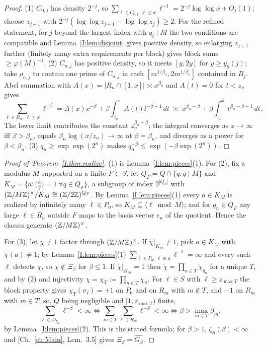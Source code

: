 \begin{proof}
(1) $C_{0,j}$ has density $2^{-j}$, so
$\sum_{\ell\in C_{0,j},\ \ell\le x}\ell^{-1}=2^{-j}\log\log x+O_j(1)$; choose $z_{j+1}$ with
$2^{-j}(\log\log z_{j+1}-\log\log z_j)\ge2$. For the refined statement, for $j$ beyond the
largest index with $q_i\mid M$ the two conditions are compatible and
Lemma~\ref{I:lem:disjoint} gives positive density, so enlarging $z_{j+1}$ further (finitely
many extra requirements per block) gives block sums $\ge\varphi(M)^{-1}$.
(2) $C_{n,j}$ has positive density, so it meets $[y,2y]$ for $y\ge y_0(j)$; take
$\rho_{n,j}$ to contain one prime of $C_{n,j}$ in each $[m^{1/\beta_n},2m^{1/\beta_n}]$
contained in $B_j$. Abel summation with $A(x)=|R_n\cap[1,x]|\asymp x^{\beta_n}$ and $A(t)=0$ for $t<z_n$ gives
\[
\sum_{\ell\in R_n,\ \ell\le x}\ell^{-\beta}=A(x)x^{-\beta}+\beta\int_{z_n}^{x}A(t)t^{-\beta-1}\,dt
\ \asymp\ x^{\beta_n-\beta}+\beta\int_{z_n}^{x}t^{\beta_n-\beta-1}\,dt .
\]
The lower limit contributes the constant $z_n^{\beta_n-\beta}$; the integral converges as
$x\to\infty$ iff $\beta>\beta_n$, equals $\beta_n\log(x/z_n)\to\infty$ at $\beta=\beta_n$,
and diverges as a power for $\beta<\beta_n$.
(3) $q_n\ge\exp\exp(2^n)$ makes $q_n^{-\beta}\le\exp(-\beta\exp(2^n))$.
\end{proof}

\begin{proof}[Proof of Theorem~\ref{I:thm:realize}]
(1) is Lemma~\ref{I:lem:pieces}(1). For (2), fix a modulus $M$ supported on a finite
$F\subset S$, let $Q_F=Q\cap\{q:q\mid M\}$ and
$K_M=\{a:\bigl(\tfrac{a}{q}\bigr)=1\ \forall q\in Q_F\}$, a subgroup of index $2^{|Q_F|}$
with $(\mathbb{Z}/M\mathbb{Z})^\times/K_M\cong(\mathbb{Z}/2\mathbb{Z})^{Q_F}$. By Lemma~\ref{I:lem:pieces}(1) every $a\in K_M$
is realized by infinitely many $\ell\in P_0$, so $K_M\subseteq\langle\ell\bmod M\rangle$; and
for $q_n\in Q_F$ any large $\ell\in R_n$ outside $F$ maps to the basis vector $e_n$ of the
quotient. Hence the classes generate $(\mathbb{Z}/M\mathbb{Z})^\times$.

For (3), let $\chi\ne1$ factor through $(\mathbb{Z}/M\mathbb{Z})^\times$. If $\tilde\chi|_{K_M}\ne1$, pick
$a\in K_M$ with $\tilde\chi(a)\ne1$; by Lemma~\ref{I:lem:pieces}(1)
$\sum_{\ell\in P_0,\ \ell\equiv a}\ell^{-1}=\infty$ and every such $\ell$ detects $\chi$, so
$\chi\notin\Xi_\beta$ for $\beta\le1$. If $\tilde\chi|_{K_M}=1$ then
$\tilde\chi=\prod_{n\in T}\tilde\chi_{q_n}$ for a unique $T$, and by (2) and injectivity
$\chi=\chi_T:=\prod_{n\in T}\chi_n$. For $\ell\in S$ with $\ell\ge z_{\max T}$ the block
property gives $\chi_T(\sigma_\ell)=+1$ on $P_0$ and on $R_m$ with $m\notin T$, and $-1$ on
$R_m$ with $m\in T$; so, $Q$ being negligible and $[1,z_{\max T})$ finite,
\[
\sum_{\ell\in D_{\chi_T}}\ell^{-\beta}<\infty\iff\sum_{m\in T}\sum_{\ell\in R_m}\ell^{-\beta}<\infty
\iff\beta>\max_{m\in T}\beta_m,
\]
by Lemma~\ref{I:lem:pieces}(2). This is the stated formula; for $\beta>1$,
$\zeta_S(\beta)<\infty$ and [Ch.~\ref{ch:Main}, Lem.~3.5] gives $\Xi_\beta=\widehat{G_S}$.
\end{proof}

